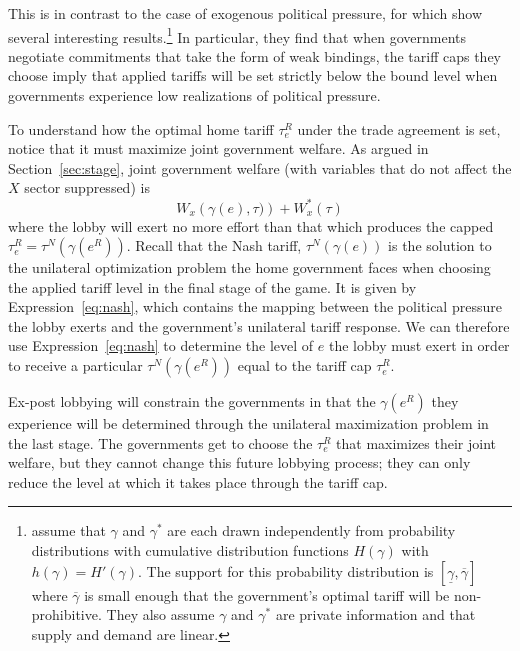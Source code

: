 \documentclass[12pt,titlepage]{article}
\newcommand{\ov}{\overline}
\newcommand{\un}{\underline}
\newcommand{\ga}{\gamma}
\begin{document}
This is in contrast to the case of exogenous political pressure, for which \Textcite{bs2005} show several interesting results.\footnote{\Textcite{bs2005} assume that $\ga$ and $\ga^*$ are each drawn independently from probability distributions with cumulative distribution functions $H(\ga)$ with $h(\ga)=H'(\ga)$. The support for this probability distribution is $\left[\un{\ga}, \ov{\ga} \right]$ where $\ov{\ga}$ is small enough that the government's optimal tariff will be non-prohibitive. They also assume $\ga$ and $\ga^*$ are private information and that supply and demand are linear.} In particular, they find that when governments negotiate commitments that take the form of weak bindings, the tariff caps they choose imply that applied tariffs will be set strictly below the bound level when governments experience low realizations of political pressure.

To understand how the optimal home tariff $\tau_e^R$ under the trade agreement is set, notice that it must maximize joint government welfare. As argued in Section~\ref{sec:stage}, joint government welfare (with variables that do not affect the $X$ sector suppressed) is
  \begin{equation}
		W_x \left(\ga(e),\tau) \right) + W_x^*\left(\tau \right)
	  \label{exp:1}
	\end{equation}
where the lobby will exert no more effort than that which produces the capped $\tau_e^R=\tau^N(\ga(e^R))$. Recall that the Nash tariff, $\tau^N(\ga(e))$ is the solution to the unilateral optimization problem the home government faces when choosing the applied tariff level in the final stage of the game. It is given by Expression~\ref{eq:nash}, which contains the mapping between the political pressure the lobby exerts and the government's unilateral tariff response. We can therefore use Expression~\ref{eq:nash} to determine the level of $e$ the lobby must exert in order to receive a particular $\tau^N(\ga(e^R))$ equal to the tariff cap $\tau_e^R$.

Ex-post lobbying will constrain the governments in that the $\ga\left(e^R\right)$ they experience will be determined through the unilateral maximization problem in the last stage. The governments get to choose the $\tau_e^R$ that maximizes their joint welfare, but they cannot change this future lobbying process; they can only reduce the level at which it takes place through the tariff cap.
\end{document}
